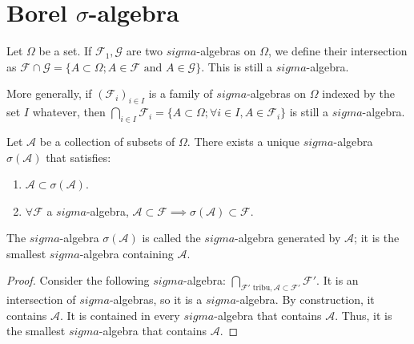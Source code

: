 \section{Borel $\sigma$-algebra}%
Let $\Omega$ be a set. If $\mathcal{F}_1, \mathcal{G}$ are two $sigma$-algebras on $\Omega$, we define their intersection as $\mathcal{F} \cap \mathcal{G} = \{A \subset \Omega; A \in \mathcal{F} \text{ and } A \in \mathcal{G}\}$. This is still a $sigma$-algebra.

More generally, if $(\mathcal{F}_i)_{i \in I}$ is a family of $sigma$-algebras on $\Omega$ indexed by the set $I$ whatever, then $\bigcap_{i \in I} \mathcal{F}_i = \{A \subset \Omega; \forall i \in I, A \in \mathcal{F}_i\}$ is still a $sigma$-algebra.%
\begin{proposition}
Let $\mathcal{A}$ be a collection of subsets of $\Omega$. There exists a unique $sigma$-algebra $\sigma(\mathcal{A})$ that satisfies:
\begin{enumerate}
    \item[i)] $\mathcal{A} \subset \sigma(\mathcal{A})$.
\item[ii)] $\forall \mathcal{F}$ a $sigma$-algebra, $\mathcal{A} \subset \mathcal{F} \implies \sigma(\mathcal{A}) \subset \mathcal{F}$.
\end{enumerate}
The $sigma$-algebra $\sigma(\mathcal{A})$ is called the $sigma$-algebra generated by $\mathcal{A}$; it is the smallest $sigma$-algebra containing $\mathcal{A}$.
\end{proposition}%
\begin{proof}
Consider the following $sigma$-algebra: $\bigcap_{\mathcal{F}' \text{ tribu}, \mathcal{A} \subset \mathcal{F}'} \mathcal{F}'$. It is an intersection of $sigma$-algebras, so it is a $sigma$-algebra. By construction, it contains $\mathcal{A}$. It is contained in every $sigma$-algebra that contains $\mathcal{A}$. Thus, it is the smallest $sigma$-algebra that contains $\mathcal{A}$.
\end{proof}%
